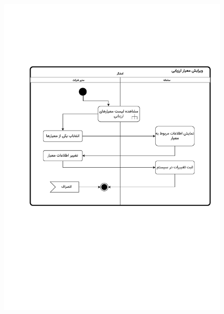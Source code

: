 \begin{figure}[ht!]
	\centering
	\includegraphics[scale=0.8, page=1]{figs/OOD-activity-editeval.pdf}
\end{figure}
\FloatBarrier
\newpage

